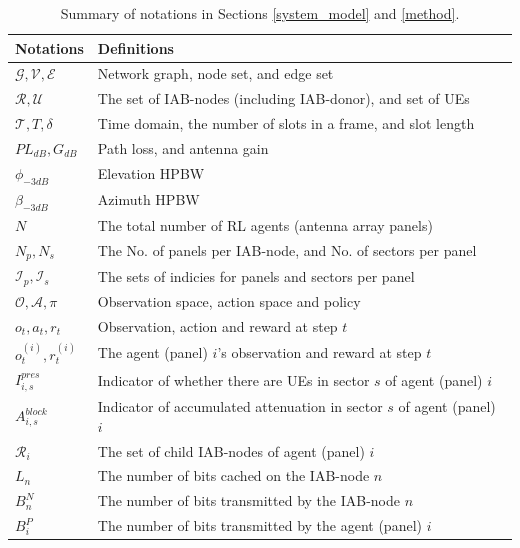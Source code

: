\setlength{\textfloatsep}{6pt}
\begin{table}[!h]
\scriptsize
    \caption{\small Summary of notations in Sections \ref{system_model} and \ref{method}.}
    \label{notation_1}
    \centering
    \begin{tabular}{@{\hspace{1pt}} l @{\hspace{1pt}} l}
        \toprule
        Notations & Definitions \\
        \midrule
        $\mathcal{G},\mathcal{V},\mathcal{E}$ & Network graph, node set, and edge set\\
        $\mathcal{R},\mathcal{U}$ & The set of IAB-nodes (including IAB-donor), and set of UEs\\
        $\mathcal{T},T,\delta$ & Time domain, the number of slots in a frame, and slot length\\
        $PL_{dB},G_{dB}$ & Path loss, and antenna gain\\
        $\phi_{-3dB}$ & Elevation HPBW\\
        $\beta_{-3dB}$ & Azimuth HPBW\\
        $N$ & The total number of RL agents (antenna array panels)\\
        $N_p,N_s$ & The No. of panels per IAB-node, and No. of sectors per panel\\
        $\mathcal{I}_p,\mathcal{I}_s$ & The sets of indicies for panels and sectors per panel\\
        $\mathcal{O},\mathcal{A},\pi$ & Observation space, action space and policy\\
        $o_t,a_t,r_t$ & Observation, action and reward at step $t$\\
        $o^{(i)}_t,r^{(i)}_t$ & The agent (panel) $i$'s observation and reward at step $t$\\
        $I^{pres}_{i,s}$ & Indicator of whether there are UEs in sector $s$ of agent (panel) $i$\\
        $A^{block}_{i,s}$ & Indicator of accumulated attenuation in sector $s$ of agent (panel) $i$\\
        $\mathcal{R}_i$ & The set of child IAB-nodes of agent (panel) $i$\\
        $L_n$ & The number of bits cached on the IAB-node $n$\\
        $B^N_n$ & The number of bits transmitted by the IAB-node $n$\\
        $B^P_i$ & The number of bits transmitted by the agent (panel) $i$\\

\end{tabular}
\end{table}
